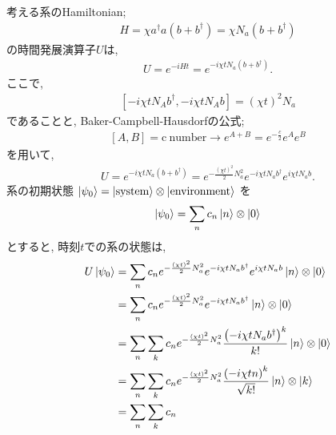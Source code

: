 \begin{ex}
    \label{ex8.31}
    考える系のHamiltonian;
    \begin{align*}
        H = \chi a^\dagger a \left( b + b^\dagger\right)
        =  \chi N_a \left( b + b^\dagger\right)
    \end{align*}
    の時間発展演算子$U$は,
    \begin{align*}
        U = e^{ - i H t} = e^{ - i \chi t N_a \left( b + b^\dagger\right) }.
    \end{align*}
    ここで,
    \begin{align*}
        \left[ - i \chi t N_A b^\dagger,  - i \chi t N_A b\right] = \left( \chi t\right)^2 N_a
    \end{align*}
    であることと, Baker-Campbell-Hausdorfの公式;
    \begin{align*}
        \left[ A, B\right] = \mathrm{c \ number} \to e^{A+B} = e^{- \frac{c}{2}} e^A e^B
    \end{align*}
    を用いて,
    \begin{align*}
        U
        = e^{ - i \chi t N_a \left( b + b^\dagger\right) }
        = e^{ - \frac{\left( \chi t\right)^2}{2}N_a^2} e^{- i \chi t N_a b^\dagger}e^{ i \chi t N_a b}.
    \end{align*}
    系の初期状態
    $\ket{ \psi_0} = \ket{\mathrm{system}} \otimes \ket{\mathrm{environment}}$
    を
    \begin{align*}
        \ket{\psi_0} = \sum_n c_n \ket{n} \otimes \ket{0}
    \end{align*}
    とすると, 時刻$t$での系の状態は,
    \begin{align*}
        U \ket{\psi_0}
         & =
        \sum_n c_n
        e^{- \frac{\left( \chi t\right)^2}{2}N_a^2}
        e^{- i \chi t N_a b^\dagger}
        e^{ i \chi t N_a b}
        \ket{n} \otimes \ket{0} \\
         & =
        \sum_n c_n
        e^{ - \frac{\left( \chi t\right)^2}{2}N_a^2}
        e^{- i \chi t N_a b^\dagger}
        \ket{n} \otimes \ket{0} \\
         & =
        \sum_n \sum_k c_n
        e^{ - \frac{\left( \chi t\right)^2}{2}N_a^2}
        \frac{\left( - i \chi t N_a b^\dagger \right)^k}{k!}
        \ket{n} \otimes \ket{0} \\
         & =
        \sum_n \sum_k c_n
        e^{- \frac{\left( \chi t\right)^2}{2}N_a^2}
        \frac{\left( - i \chi t n \right)^k}{ \sqrt{k!}}
        \ket{n} \otimes \ket{k} \\
         & =
        \sum_n \sum_k c_n

\end{align*}
\end{ex}
